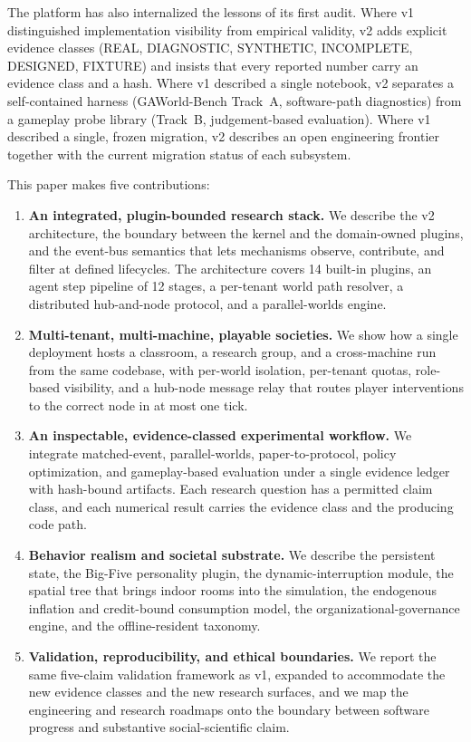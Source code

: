 The platform has also internalized the lessons of its first audit.  Where
v1 distinguished implementation visibility from empirical validity, v2 adds
explicit evidence classes (\textsf{REAL}, \textsf{DIAGNOSTIC},
\textsf{SYNTHETIC}, \textsf{INCOMPLETE}, \textsf{DESIGNED}, \textsf{FIXTURE}) and
insists that every reported number carry an evidence class and a hash.  Where
v1 described a single notebook, v2 separates a self-contained harness
(\textsf{GAWorld-Bench Track~A}, software-path diagnostics) from a gameplay
probe library (\textsf{Track~B}, judgement-based evaluation).  Where v1
described a single, frozen migration, v2 describes an open engineering frontier
together with the current migration status of each subsystem.

This paper makes five contributions:

\begin{enumerate}[leftmargin=*,label=\textbf{C\arabic*.}]
  \item \textbf{An integrated, plugin-bounded research stack.}  We describe
  the v2 architecture, the boundary between the kernel and the
  domain-owned plugins, and the event-bus semantics that lets mechanisms
  observe, contribute, and filter at defined lifecycles.  The architecture
  covers 14 built-in plugins, an agent step pipeline of 12 stages, a
  per-tenant world path resolver, a distributed hub-and-node protocol, and a
  parallel-worlds engine.

  \item \textbf{Multi-tenant, multi-machine, playable societies.}  We show how
  a single deployment hosts a classroom, a research group, and a
  cross-machine run from the same codebase, with per-world isolation,
  per-tenant quotas, role-based visibility, and a hub-node message relay that
  routes player interventions to the correct node in at most one tick.

  \item \textbf{An inspectable, evidence-classed experimental workflow.}  We
  integrate matched-event, parallel-worlds, paper-to-protocol, policy
  optimization, and gameplay-based evaluation under a single evidence ledger
  with hash-bound artifacts.  Each research question has a permitted claim
  class, and each numerical result carries the evidence class and the
  producing code path.

  \item \textbf{Behavior realism and societal substrate.}  We describe the
  persistent state, the Big-Five personality plugin, the dynamic-interruption
  module, the spatial tree that brings indoor rooms into the simulation, the
  endogenous inflation and credit-bound consumption model, the
  organizational-governance engine, and the offline-resident taxonomy.

  \item \textbf{Validation, reproducibility, and ethical boundaries.}  We
  report the same five-claim validation framework as v1, expanded to
  accommodate the new evidence classes and the new research surfaces, and
  we map the engineering and research roadmaps onto the boundary between
  software progress and substantive social-scientific claim.
\end{enumerate}

